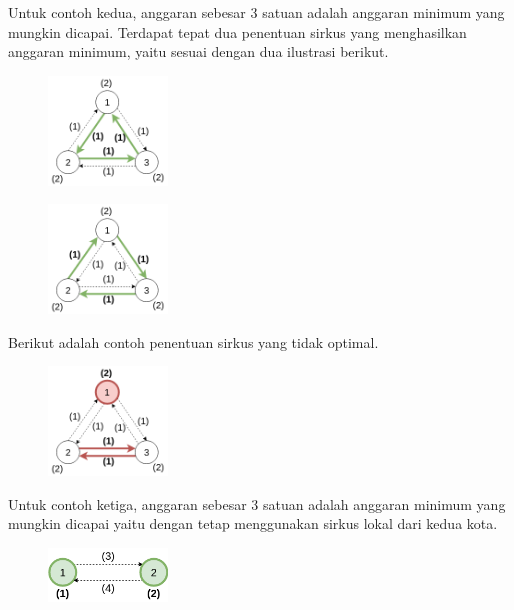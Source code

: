 \documentclass[../main_problemset.tex]{subfiles} %
\begin{document}
Untuk contoh kedua, anggaran sebesar 3 satuan adalah anggaran minimum yang mungkin dicapai. Terdapat tepat dua penentuan sirkus yang menghasilkan anggaran minimum, yaitu sesuai dengan dua ilustrasi berikut.

\vspace{-0.8cm}
\begin{minipage}[t]{0.5\textwidth}
\begin{figure}[H]
	\centering
	\includegraphics[width=120px]{bis-ddak/asset/Sample_2_OK_1}
\end{figure}
\end{minipage}
\begin{minipage}[t]{0.5\textwidth}
\begin{figure}[H]
	\centering
	\includegraphics[width=120px]{bis-ddak/asset/Sample_2_OK_2}
\end{figure}
\end{minipage}
\vspace{0.1cm}

Berikut adalah contoh penentuan sirkus yang tidak optimal.

\begin{figure}[H]
	\centering
	\includegraphics[width=120px]{bis-ddak/asset/Sample_2_NOT_OK}
\end{figure}

Untuk contoh ketiga, anggaran sebesar 3 satuan adalah anggaran minimum yang mungkin dicapai yaitu dengan tetap menggunakan sirkus lokal dari kedua kota.

\begin{figure}[H]
	\centering
	\includegraphics[width=120px]{bis-ddak/asset/Sample_3_OK}
\end{figure}
\end{document}
